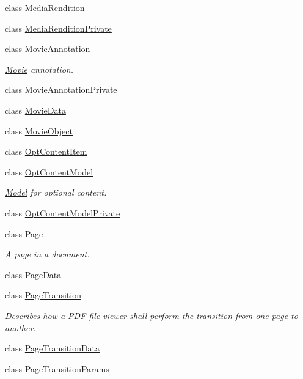 \begin{DoxyCompactItemize}
class \hyperlink{class_poppler_1_1_media_rendition}{Media\+Rendition}
\item 
class \hyperlink{class_poppler_1_1_media_rendition_private}{Media\+Rendition\+Private}
\item 
class \hyperlink{class_poppler_1_1_movie_annotation}{Movie\+Annotation}
\begin{DoxyCompactList}\small\item\em \hyperlink{class_movie}{Movie} annotation. \end{DoxyCompactList}\item 
class \hyperlink{class_poppler_1_1_movie_annotation_private}{Movie\+Annotation\+Private}
\item 
class \hyperlink{class_poppler_1_1_movie_data}{Movie\+Data}
\item 
class \hyperlink{class_poppler_1_1_movie_object}{Movie\+Object}
\item 
class \hyperlink{class_poppler_1_1_opt_content_item}{Opt\+Content\+Item}
\item 
class \hyperlink{class_poppler_1_1_opt_content_model}{Opt\+Content\+Model}
\begin{DoxyCompactList}\small\item\em \hyperlink{class_model}{Model} for optional content. \end{DoxyCompactList}\item 
class \hyperlink{class_poppler_1_1_opt_content_model_private}{Opt\+Content\+Model\+Private}
\item 
class \hyperlink{class_poppler_1_1_page}{Page}
\begin{DoxyCompactList}\small\item\em A page in a document. \end{DoxyCompactList}\item 
class \hyperlink{class_poppler_1_1_page_data}{Page\+Data}
\item 
class \hyperlink{class_poppler_1_1_page_transition}{Page\+Transition}
\begin{DoxyCompactList}\small\item\em Describes how a P\+DF file viewer shall perform the transition from one page to another. \end{DoxyCompactList}\item 
class \hyperlink{class_poppler_1_1_page_transition_data}{Page\+Transition\+Data}
\item 
class \hyperlink{class_poppler_1_1_page_transition_params}{Page\+Transition\+Params}
\item 

\end{DoxyCompactItemize}
